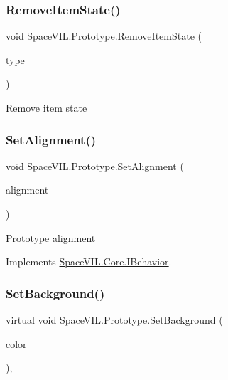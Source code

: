 \subsubsection{\texorpdfstring{Remove\+Item\+State()}{RemoveItemState()}}
{\footnotesize\ttfamily void Space\+V\+I\+L.\+Prototype.\+Remove\+Item\+State (\begin{DoxyParamCaption}\item[{Item\+State\+Type}]{type }\end{DoxyParamCaption})\hspace{0.3cm}{\ttfamily [inline]}}



Remove item state 

\mbox{\label{class_space_v_i_l_1_1_prototype_ac9d6f8cfbc2716ee740a8a21eaff33a8}} 
\subsubsection{\texorpdfstring{Set\+Alignment()}{SetAlignment()}}
{\footnotesize\ttfamily void Space\+V\+I\+L.\+Prototype.\+Set\+Alignment (\begin{DoxyParamCaption}\item[{Item\+Alignment}]{alignment }\end{DoxyParamCaption})\hspace{0.3cm}{\ttfamily [inline]}}



\mbox{\hyperlink{class_space_v_i_l_1_1_prototype}{Prototype}} alignment 



Implements \mbox{\hyperlink{interface_space_v_i_l_1_1_core_1_1_i_behavior}{Space\+V\+I\+L.\+Core.\+I\+Behavior}}.

\mbox{\label{class_space_v_i_l_1_1_prototype_aa35761db5812bd6125ab380ad38b9a46}} 
\subsubsection{\texorpdfstring{Set\+Background()}{SetBackground()}}
{\footnotesize\ttfamily virtual void Space\+V\+I\+L.\+Prototype.\+Set\+Background (\begin{DoxyParamCaption}\item[{Color}]{color }\end{DoxyParamCaption})\hspace{0.3cm}{\ttfamily [inline]}, {\ttfamily [virtual]}}



